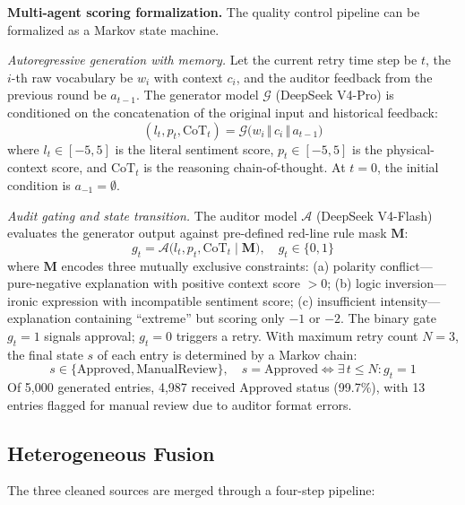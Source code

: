 \documentclass[conference]{IEEEtran}
\begin{document}
\textbf{Multi-agent scoring formalization.}
The quality control pipeline can be formalized as a Markov state machine.

\textit{Autoregressive generation with memory.}
Let the current retry time step be $t$, the $i$-th raw vocabulary be $w_i$ with
context $c_i$, and the auditor feedback from the previous round be $a_{t-1}$.
The generator model $\mathcal{G}$ (DeepSeek V4-Pro) is conditioned on the
concatenation of the original input and historical feedback:
\begin{equation}
(l_t, p_t, \text{CoT}_t) = \mathcal{G}\big(w_i \,\Vert\, c_i \,\Vert\, a_{t-1}\big)
\label{eq:generator}
\end{equation}
where $l_t \in [-5, 5]$ is the literal sentiment score, $p_t \in [-5, 5]$ is the
physical-context score, and $\text{CoT}_t$ is the reasoning chain-of-thought.
At $t=0$, the initial condition is $a_{-1} = \emptyset$.

\textit{Audit gating and state transition.}
The auditor model $\mathcal{A}$ (DeepSeek V4-Flash) evaluates the generator
output against pre-defined red-line rule mask $\mathbf{M}$:
\begin{equation}
g_t = \mathcal{A}\big(l_t, p_t, \text{CoT}_t \mid \mathbf{M}\big), \quad g_t \in \{0, 1\}
\label{eq:auditor}
\end{equation}
where $\mathbf{M}$ encodes three mutually exclusive constraints:
(a) polarity conflict---pure-negative explanation with positive context score $> 0$;
(b) logic inversion---ironic expression with incompatible sentiment score;
(c) insufficient intensity---explanation containing ``extreme'' but scoring only
$-1$ or $-2$.
The binary gate $g_t = 1$ signals approval; $g_t = 0$ triggers a retry.
With maximum retry count $N = 3$, the final state $s$ of each entry is
determined by a Markov chain:
\begin{equation}
s \in \{\text{Approved}, \text{ManualReview}\}, \quad s = \text{Approved} \iff \exists\, t \leq N: g_t = 1
\label{eq:state}
\end{equation}
Of 5,000 generated entries, 4,987 received Approved status (99.7\%),
with 13 entries flagged for manual review due to auditor format errors.

\subsection{Heterogeneous Fusion}

The three cleaned sources are merged through a four-step pipeline:
\end{document}
